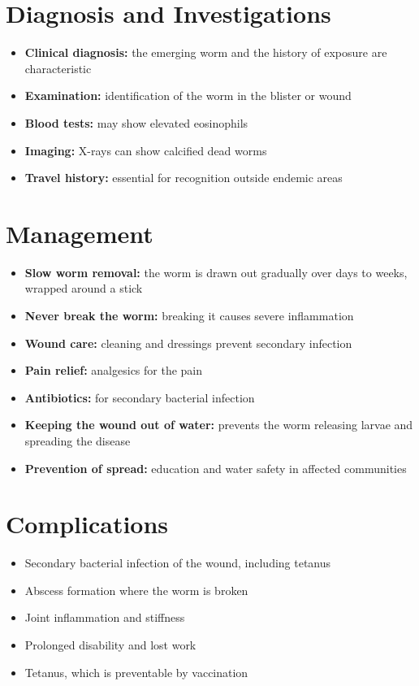 \section*{Diagnosis and Investigations}
\begin{itemize}
    \item \textbf{Clinical diagnosis:} the emerging worm and the history of exposure are characteristic
    \item \textbf{Examination:} identification of the worm in the blister or wound
    \item \textbf{Blood tests:} may show elevated eosinophils
    \item \textbf{Imaging:} X-rays can show calcified dead worms
    \item \textbf{Travel history:} essential for recognition outside endemic areas
\end{itemize}

\section*{Management}
\begin{itemize}
    \item \textbf{Slow worm removal:} the worm is drawn out gradually over days to weeks, wrapped around a stick
    \item \textbf{Never break the worm:} breaking it causes severe inflammation
    \item \textbf{Wound care:} cleaning and dressings prevent secondary infection
    \item \textbf{Pain relief:} analgesics for the pain
    \item \textbf{Antibiotics:} for secondary bacterial infection
    \item \textbf{Keeping the wound out of water:} prevents the worm releasing larvae and spreading the disease
    \item \textbf{Prevention of spread:} education and water safety in affected communities
\end{itemize}

\section*{Complications}
\begin{itemize}
    \item Secondary bacterial infection of the wound, including tetanus
    \item Abscess formation where the worm is broken
    \item Joint inflammation and stiffness
    \item Prolonged disability and lost work
    \item Tetanus, which is preventable by vaccination
\end{itemize}

